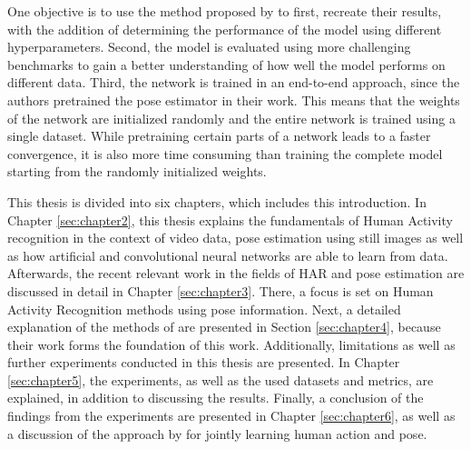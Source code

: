 
One objective is to use the method proposed by \cite{luvizon_2d/3d_2018} to first, recreate their results, with the addition of determining the performance of the model using different hyperparameters.
Second, the model is evaluated using more challenging benchmarks to gain a better understanding of how well the model performs on different data.
Third, the network is trained in an end-to-end approach, since the authors pretrained the pose estimator in their work.
This means that the weights of the network are initialized randomly and the entire network is trained using a single dataset.
While pretraining certain parts of a network leads to a faster convergence, it is also more time consuming than training the complete model starting from the randomly initialized weights.

This thesis is divided into six chapters, which includes this introduction.
In Chapter \ref{sec:chapter2}, this thesis explains the fundamentals of Human Activity recognition in the context of video data, pose estimation using still images as well as how artificial and convolutional neural networks are able to learn from data.
Afterwards, the recent relevant work in the fields of HAR and pose estimation are discussed in detail in Chapter \ref{sec:chapter3}.
There, a focus is set on Human Activity Recognition methods using pose information.
Next, a detailed explanation of the methods of \cite{luvizon_2d/3d_2018} are presented in Section \ref{sec:chapter4}, because their work forms the foundation of this work.
Additionally, limitations as well as further experiments conducted in this thesis are presented.
In Chapter \ref{sec:chapter5}, the experiments, as well as the used datasets and metrics, are explained, in addition to discussing the results.
Finally, a conclusion of the findings from the experiments are presented in Chapter \ref{sec:chapter6}, as well as a discussion of the approach by \cite{luvizon_2d/3d_2018} for jointly learning human action and pose.


